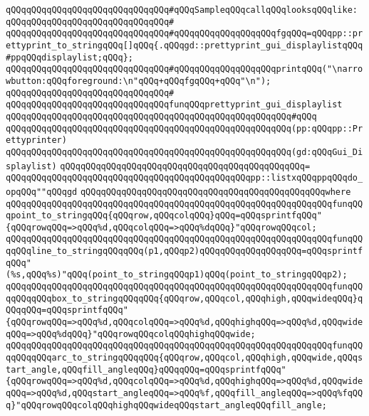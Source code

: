 \verb|qQQqqQQqqQQqqQQqqQQqqQQqqQQqqQQq#qQQqSampleqQQqcallqQQqlooksqQQqlike:|\newline
\verb|qQQqqQQqqQQqqQQqqQQqqQQqqQQqqQQq#|\newline
\verb|qQQqqQQqqQQqqQQqqQQqqQQqqQQqqQQq#qQQqqQQqqQQqqQQqqQQqfgqQQq=qQQqpp::prettyprint_to_stringqQQq[]qQQq{.qQQqgd::prettyprint_gui_displaylistqQQq#ppqQQqdisplaylist;qQQq};|\newline
\verb|qQQqqQQqqQQqqQQqqQQqqQQqqQQqqQQq#qQQqqQQqqQQqqQQqqQQqprintqQQq("\narrowbutton:qQQqforeground:\n"qQQq+qQQqfgqQQq+qQQq"\n");|\newline
\verb|qQQqqQQqqQQqqQQqqQQqqQQqqQQqqQQq#|\newline
\verb|qQQqqQQqqQQqqQQqqQQqqQQqqQQqqQQqfunqQQqprettyprint_gui_displaylist|\newline
\verb|qQQqqQQqqQQqqQQqqQQqqQQqqQQqqQQqqQQqqQQqqQQqqQQqqQQqqQQq#qQQq|\newline
\verb|qQQqqQQqqQQqqQQqqQQqqQQqqQQqqQQqqQQqqQQqqQQqqQQqqQQqqQQq(pp:qQQqpp::Prettyprinter)|\newline
\verb|qQQqqQQqqQQqqQQqqQQqqQQqqQQqqQQqqQQqqQQqqQQqqQQqqQQqqQQq(gd:qQQqGui_Displaylist)|\newline
\verb|qQQqqQQqqQQqqQQqqQQqqQQqqQQqqQQqqQQqqQQqqQQqqQQq=|\newline
\verb|qQQqqQQqqQQqqQQqqQQqqQQqqQQqqQQqqQQqqQQqqQQqqQQqpp::listxqQQqppqQQqdo_opqQQq""qQQqgd|\newline
\verb|qQQqqQQqqQQqqQQqqQQqqQQqqQQqqQQqqQQqqQQqqQQqqQQqwhere|\newline
\verb|qQQqqQQqqQQqqQQqqQQqqQQqqQQqqQQqqQQqqQQqqQQqqQQqqQQqqQQqqQQqqQQqfunqQQqpoint_to_stringqQQq{qQQqrow,qQQqcolqQQq}qQQq=qQQqsprintfqQQq"{qQQqrowqQQq=>qQQq%d,qQQqcolqQQq=>qQQq%dqQQq}"qQQqrowqQQqcol;|\newline
\verb|qQQqqQQqqQQqqQQqqQQqqQQqqQQqqQQqqQQqqQQqqQQqqQQqqQQqqQQqqQQqqQQqfunqQQqqQQqline_to_stringqQQqqQQq(p1,qQQqp2)qQQqqQQqqQQqqQQqqQQq=qQQqsprintfqQQq"(%s,qQQq%s)"qQQq(point_to_stringqQQqp1)qQQq(point_to_stringqQQqp2);|\newline
\verb|qQQqqQQqqQQqqQQqqQQqqQQqqQQqqQQqqQQqqQQqqQQqqQQqqQQqqQQqqQQqqQQqfunqQQqqQQqqQQqbox_to_stringqQQqqQQq{qQQqrow,qQQqcol,qQQqhigh,qQQqwideqQQq}qQQqqQQq=qQQqsprintfqQQq"{qQQqrowqQQq=>qQQq%d,qQQqcolqQQq=>qQQq%d,qQQqhighqQQq=>qQQq%d,qQQqwideqQQq=>qQQq%dqQQq}"qQQqrowqQQqcolqQQqhighqQQqwide;|\newline
\verb|qQQqqQQqqQQqqQQqqQQqqQQqqQQqqQQqqQQqqQQqqQQqqQQqqQQqqQQqqQQqqQQqfunqQQqqQQqqQQqarc_to_stringqQQqqQQq{qQQqrow,qQQqcol,qQQqhigh,qQQqwide,qQQqstart_angle,qQQqfill_angleqQQq}qQQqqQQq=qQQqsprintfqQQq"{qQQqrowqQQq=>qQQq%d,qQQqcolqQQq=>qQQq%d,qQQqhighqQQq=>qQQq%d,qQQqwideqQQq=>qQQq%d,qQQqstart_angleqQQq=>qQQq%f,qQQqfill_angleqQQq=>qQQq%fqQQq}"qQQqrowqQQqcolqQQqhighqQQqwideqQQqstart_angleqQQqfill_angle;|\newline
